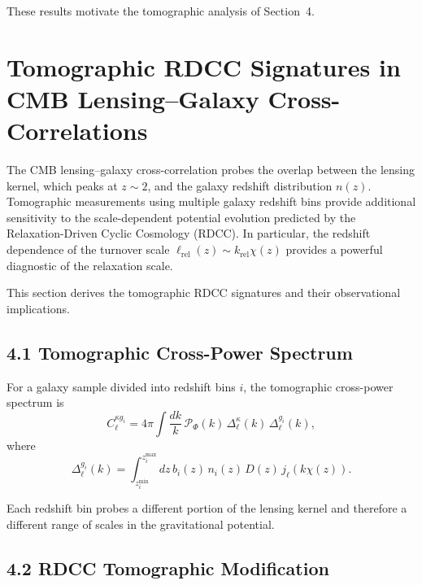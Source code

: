 \documentclass[11pt,a4paper]{article}
\begin{document}
These results motivate the tomographic analysis of Section~4.

\section{Tomographic RDCC Signatures in CMB Lensing–Galaxy Cross-Correlations}

The CMB lensing–galaxy cross-correlation probes the overlap between the lensing kernel, 
which peaks at $z \sim 2$, and the galaxy redshift distribution $n(z)$. Tomographic 
measurements using multiple galaxy redshift bins provide additional sensitivity to the 
scale-dependent potential evolution predicted by the Relaxation-Driven Cyclic Cosmology 
(RDCC). In particular, the redshift dependence of the turnover scale 
$\ell_{\mathrm{rel}}(z) \sim k_{\mathrm{rel}} \chi(z)$ provides a powerful diagnostic of the 
relaxation scale.

This section derives the tomographic RDCC signatures and their observational implications.

\subsection*{4.1 Tomographic Cross-Power Spectrum}

For a galaxy sample divided into redshift bins $i$, the tomographic cross-power spectrum is
\begin{equation}
    C_{\ell}^{\kappa g_{i}}
    = 4\pi \int \frac{dk}{k}\,
      \mathcal{P}_{\Phi}(k)\,
      \Delta_{\ell}^{\kappa}(k)\,
      \Delta_{\ell}^{g_{i}}(k),
\end{equation}
where
\begin{equation}
    \Delta_{\ell}^{g_{i}}(k)
    = \int_{z_{i}^{\mathrm{min}}}^{z_{i}^{\mathrm{max}}}
      dz\,b_{i}(z)\,n_{i}(z)\,D(z)\,
      j_{\ell}(k\chi(z)).
\end{equation}

Each redshift bin probes a different portion of the lensing kernel and therefore a different 
range of scales in the gravitational potential.

\subsection*{4.2 RDCC Tomographic Modification}
\end{document}
